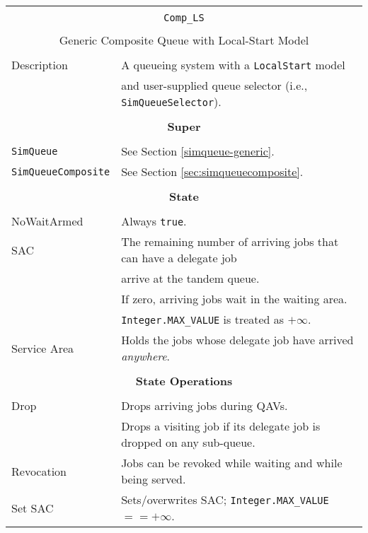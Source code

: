 \begin{tabular}{|l|l|}
	\hline
	\multicolumn{2}{|c|}{} \\
	\multicolumn{2}{|c|}{\lstinline[basicstyle=\large]{Comp_LS}} \\
	\multicolumn{2}{|c|}{} \\
	\multicolumn{2}{|c|}{Generic Composite Queue with Local-Start Model} \\
	\multicolumn{2}{|c|}{} \\
	\hline
	Description & A queueing system with a \lstinline|LocalStart| model \\
	            & and user-supplied queue selector (i.e., \lstinline|SimQueueSelector|). \\
	\hline
	\multicolumn{2}{|c|}{} \\
	\multicolumn{2}{|c|}{\bf Super} \\
	\multicolumn{2}{|c|}{} \\
	\hline
	\lstinline|SimQueue| & See Section \ref{simqueue-generic}. \\
	\lstinline|SimQueueComposite| & See Section \ref{sec:simqueuecomposite}. \\
	\hline
	\multicolumn{2}{|c|}{} \\
	\multicolumn{2}{|c|}{\bf State} \\
	\multicolumn{2}{|c|}{} \\
	\hline
	NoWaitArmed & Always \lstinline|true|. \\
	\hline
	SAC & The remaining number of arriving jobs that can have a delegate job \\
	& arrive at the tandem queue. \\
	& If zero, arriving jobs wait in the waiting area. \\
	& \lstinline|Integer.MAX_VALUE| is treated as $+\infty$. \\
	\hline
	Service Area & Holds the jobs whose delegate job have arrived {\em anywhere}. \\
	\hline
	\multicolumn{2}{|c|}{} \\
	\multicolumn{2}{|c|}{\bf State Operations} \\
	\multicolumn{2}{|c|}{} \\
	\hline
	Drop & Drops arriving jobs during QAVs. \\
	& Drops a visiting job if its delegate job is dropped on any sub-queue. \\
	\hline
	Revocation & Jobs can be revoked while waiting and while being served. \\
	\hline
	Set SAC & Sets/overwrites SAC; \lstinline|Integer.MAX_VALUE| $== +\infty$. \\

\end{tabular}
